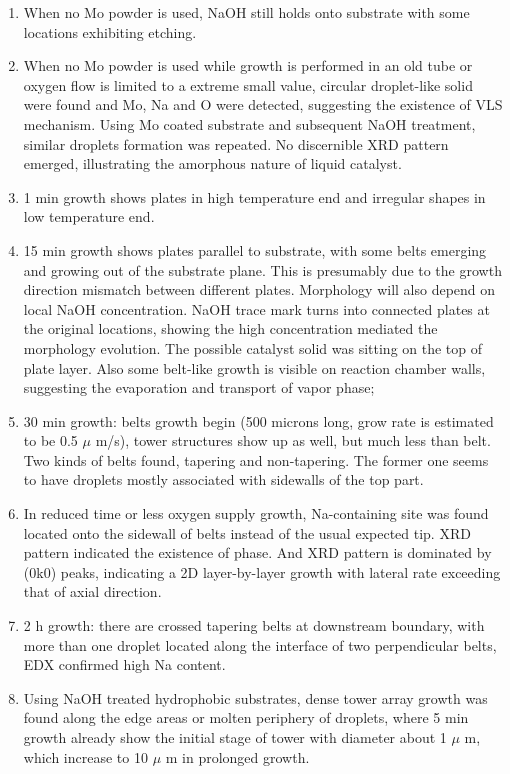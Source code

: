 \begin{enumerate}
\item When no Mo powder is used, NaOH still holds onto substrate with some locations exhibiting etching.
\item When no Mo powder is used while growth is performed in an old tube or oxygen flow is limited to a extreme small value, circular droplet-like solid were found and Mo, Na and O were detected, suggesting the existence of VLS mechanism. Using Mo coated substrate and subsequent NaOH treatment, similar droplets formation was repeated. No discernible XRD pattern emerged, illustrating the amorphous nature of liquid catalyst.
\item 1 min growth shows plates in high temperature end and irregular shapes in low temperature end.
\item 15 min growth shows  plates parallel to substrate, with some belts emerging and growing out of the substrate plane. This is presumably due to the growth direction mismatch between different plates. Morphology will also depend on local NaOH concentration. NaOH trace mark turns into connected plates at the original locations, showing the high concentration mediated the morphology evolution. The possible catalyst solid was sitting on the top of plate layer. Also some belt-like growth is visible on reaction chamber walls, suggesting the evaporation and transport of  vapor phase;
\item 30 min growth: belts growth begin (500 microns long, grow rate is estimated to be 0.5 $\mu$ m/s), tower structures show up as well, but much less than belt. Two kinds of belts found, tapering and non-tapering. The former one seems to have droplets mostly associated with sidewalls of the top part.
\item In reduced time or less oxygen supply growth, Na-containing site was found located onto the sidewall of belts instead of the usual expected tip. XRD pattern indicated the existence of  phase. And  XRD pattern is dominated by (0k0) peaks, indicating a 2D layer-by-layer growth with lateral rate exceeding that of axial direction.
\item 2 h growth: there are crossed tapering belts at downstream boundary, with more than one droplet located along the interface of two perpendicular belts, EDX confirmed high Na content.
\item Using NaOH treated hydrophobic substrates, dense tower array growth was found along the edge areas or molten periphery of droplets, where 5 min growth already show the initial stage of tower with diameter about 1 $\mu$ m, which increase to 10 $\mu$ m in prolonged growth.
\end{enumerate}


